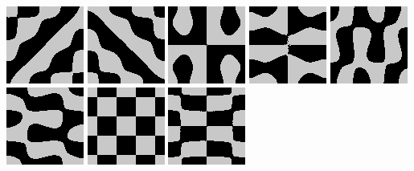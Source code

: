 \includegraphics{o/chladni_025.png}
\includegraphics{o/chladni_026.png}
\includegraphics{o/chladni_027.png}
\includegraphics{o/chladni_028.png}
\includegraphics{o/chladni_029.png}
\includegraphics{o/chladni_030.png}
\includegraphics{o/chladni_031.png}
\includegraphics{o/chladni_032.png}

